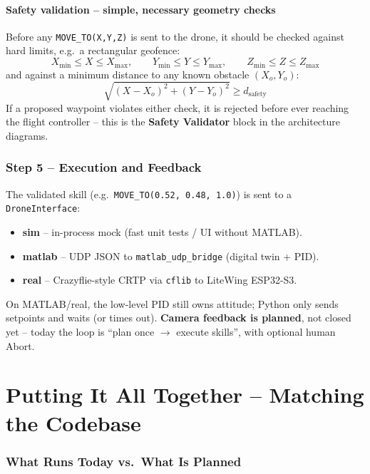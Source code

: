 \documentclass[11pt,a4paper]{article}
\begin{document}
\subsection{Safety validation -- simple, necessary geometry checks}

Before any \texttt{MOVE\_TO(X,Y,Z)} is sent to the drone, it should be checked against hard
limits, e.g.\ a rectangular geofence:
\[
X_{\min} \le X \le X_{\max}, \qquad Y_{\min} \le Y \le Y_{\max}, \qquad Z_{\min} \le Z \le Z_{\max}
\]
and against a minimum distance to any known obstacle $(X_o, Y_o)$:
\[
\sqrt{(X - X_o)^2 + (Y - Y_o)^2} \ge d_{\text{safety}}
\]
If a proposed waypoint violates either check, it is rejected before ever reaching the flight
controller -- this is the \textbf{Safety Validator} block in the architecture diagrams.

\section{Step 5 -- Execution and Feedback}

The validated skill (e.g.\ \texttt{MOVE\_TO(0.52, 0.48, 1.0)}) is sent to a
\texttt{DroneInterface}:
\begin{itemize}[itemsep=2pt]
\item \textbf{sim} -- in-process mock (fast unit tests / UI without MATLAB).
\item \textbf{matlab} -- UDP JSON to \texttt{matlab\_udp\_bridge} (digital twin + PID).
\item \textbf{real} -- Crazyflie-style CRTP via \texttt{cflib} to LiteWing ESP32-S3.
\end{itemize}
On MATLAB/real, the low-level PID still owns attitude; Python only sends setpoints and waits
(or times out). \textbf{Camera feedback is planned}, not closed yet -- today the loop is
``plan once $\to$ execute skills'', with optional human Abort.

\part{Putting It All Together -- Matching the Codebase}

\section{What Runs Today vs.\ What Is Planned}
\end{document}
